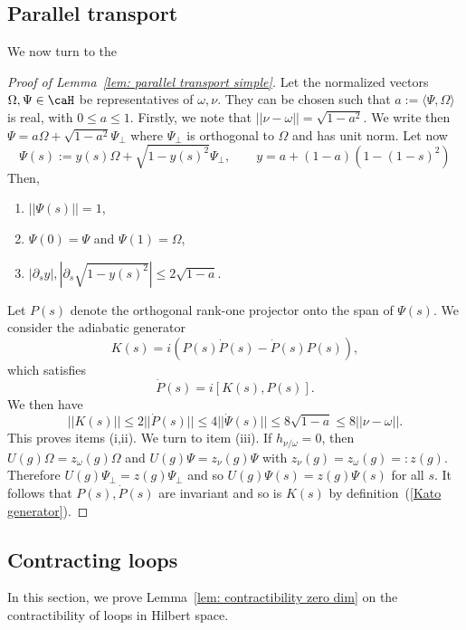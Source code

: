 %
\subsection{Parallel transport}
We now turn to the
%
\begin{proof}[Proof of Lemma~\ref{lem: parallel transport simple}]
	Let the normalized vectors $\Omega,\Psi \in \caH$ be representatives of  $\omega,\nu$. They can be chosen such that $a:= \langle\Psi,\Omega\rangle$ is real, with $0\leq a\leq 1$. Firstly, we note that $ ||\nu-\omega ||= \sqrt{1-a^2}$. 
	We write then $\Psi=a \Omega+\sqrt{1-a^2}\Psi_\perp$ where $\Psi_\perp$ is orthogonal to $\Omega$ and has unit norm. 
	Let now
	$$
	\Psi(s):=y(s)\Omega + \sqrt{1-y(s)^2}\Psi_\perp, \qquad y=a+(1-a)(1-(1-s)^2) 
	$$
	Then, 
	\begin{enumerate}
		\item $||\Psi(s)||=1$,
		\item $\Psi(0)=\Psi$ and  $\Psi(1)=\Omega$,
		\item $ |\partial_s y|,  |\partial_s \sqrt{1-y(s)^2}| \leq 2\sqrt{1-a} $. 
	\end{enumerate}
	Let $P(s)$ denote the orthogonal rank-one projector onto the span of $\Psi(s)$.
	We consider the adiabatic generator 
	\begin{equation}\label{Kato generator}
	K(s)=i (P(s)\dot{P}(s)-\dot{P}(s)P(s)),
	\end{equation}
	which satisfies
	\begin{equation*}
	\dot P(s) = i[K(s),P(s)].
	\end{equation*}
	We then have
	$$
	|| K(s)|| \leq 2 || \dot{P}(s)|| \leq  4 ||\dot{\Psi}(s)|| \leq 8 \sqrt{1-a} \leq 8 || \nu-\omega ||.
	$$
	This proves items (i,ii). We turn to item (iii). If $h_{\nu/\omega} = 0$, then $U(g) \Omega = z_\omega(g)\Omega$ and $U(g) \Psi = z_\nu(g)\Psi$ with $z_\nu(g)= z_\omega(g)=:z(g)$. Therefore $U(g) \Psi_\perp = z(g)\Psi_\perp$ and so $U(g)\Psi(s) = z(g)\Psi(s)$ for all $s$. It follows that $P(s),\dot P(s)$ are invariant and so is $K(s)$ by definition~(\ref{Kato generator}).
\end{proof}




\subsection{Contracting loops}

In this section, we prove Lemma~\ref{lem: contractibility zero dim} on the contractibility of loops in Hilbert space.

